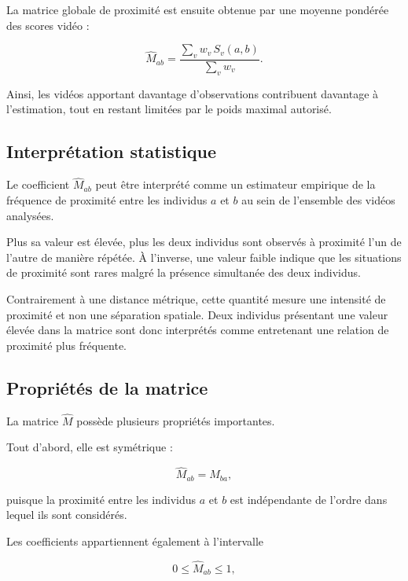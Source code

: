 \documentclass[11pt,a4paper]{report}
\begin{document}
La matrice globale de proximité est ensuite obtenue par une moyenne pondérée des
scores vidéo :

\begin{equation}
\widehat{M}_{ab}
=
\frac{
\displaystyle\sum_v
w_v\,S_v(a,b)}
{
\displaystyle\sum_v
w_v
}.
\end{equation}

Ainsi, les vidéos apportant davantage d'observations contribuent davantage à
l'estimation, tout en restant limitées par le poids maximal autorisé.

\subsection*{Interprétation statistique}

Le coefficient $\widehat{M}_{ab}$ peut être interprété comme un estimateur
empirique de la fréquence de proximité entre les individus $a$ et $b$ au sein de
l'ensemble des vidéos analysées.

Plus sa valeur est élevée, plus les deux individus sont observés à proximité
l'un de l'autre de manière répétée. À l'inverse, une valeur faible indique que
les situations de proximité sont rares malgré la présence simultanée des deux
individus.

Contrairement à une distance métrique, cette quantité mesure une intensité de
proximité et non une séparation spatiale. Deux individus présentant une valeur
élevée dans la matrice sont donc interprétés comme entretenant une relation de
proximité plus fréquente.

\subsection*{Propriétés de la matrice}

La matrice $\widehat{M}$ possède plusieurs propriétés importantes.

Tout d'abord, elle est symétrique :

\begin{equation}
\widehat{M}_{ab}
=
\widehat{M}_{ba},
\end{equation}

puisque la proximité entre les individus $a$ et $b$ est indépendante de l'ordre
dans lequel ils sont considérés.

Les coefficients appartiennent également à l'intervalle

\begin{equation}
0
\leq
\widehat{M}_{ab}
\leq
1,
\end{equation}
\end{document}
